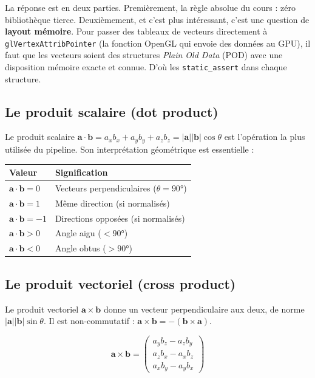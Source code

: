 \documentclass[12pt,a4paper]{report}
\newcommand{\code}[1]{\texttt{\textcolor{myblue}{#1}}}
\begin{document}
La réponse est en deux parties. Premièrement, la règle absolue du cours : zéro bibliothèque tierce. Deuxièmement, et c'est plus intéressant, c'est une question de \textbf{layout mémoire}. Pour passer des tableaux de vecteurs directement à \code{glVertexAttribPointer} (la fonction OpenGL qui envoie des données au GPU), il faut que les vecteurs soient des structures \textit{Plain Old Data} (POD) avec une disposition mémoire exacte et connue. D'où les \code{static\_assert} dans chaque structure.

\subsection{Le produit scalaire (dot product)}

Le produit scalaire $\mathbf{a} \cdot \mathbf{b} = a_x b_x + a_y b_y + a_z b_z = |\mathbf{a}||\mathbf{b}|\cos\theta$ est l'opération la plus utilisée du pipeline. Son interprétation géométrique est essentielle :

\begin{center}
\begin{tabular}{ll}
\toprule
\textbf{Valeur} & \textbf{Signification} \\
\midrule
$\mathbf{a} \cdot \mathbf{b} = 0$  & Vecteurs perpendiculaires ($\theta = 90°$) \\
$\mathbf{a} \cdot \mathbf{b} = 1$  & Même direction (si normalisés) \\
$\mathbf{a} \cdot \mathbf{b} = -1$ & Directions opposées (si normalisés) \\
$\mathbf{a} \cdot \mathbf{b} > 0$  & Angle aigu ($< 90°$) \\
$\mathbf{a} \cdot \mathbf{b} < 0$  & Angle obtus ($> 90°$) \\
\bottomrule
\end{tabular}
\end{center}

\subsection{Le produit vectoriel (cross product)}

Le produit vectoriel $\mathbf{a} \times \mathbf{b}$ donne un vecteur perpendiculaire aux deux, de norme $|\mathbf{a}||\mathbf{b}|\sin\theta$. Il est non-commutatif : $\mathbf{a} \times \mathbf{b} = -(\mathbf{b} \times \mathbf{a})$.

$$
\mathbf{a} \times \mathbf{b} = \begin{pmatrix} a_y b_z - a_z b_y \\ a_z b_x - a_x b_z \\ a_x b_y - a_y b_x \end{pmatrix}
$$
\end{document}
